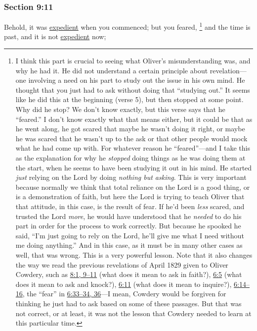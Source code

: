 	\subsubsection{Section 9:11} %
		\label{DC9-11}

		Behold, it was \hyperref[EXPEDIENT]{expedient} when you commenced; but you feared,%
			\footnote{%
				I think this part is crucial to seeing what Oliver's misunderstanding was, and why he had it. He did not understand a certain principle about revelation---one involving a need on his part to study out the issue in his own mind. He thought that you just had to ask without doing that ``studying out.'' It seems like he did this at the beginning (verse 5), but then stopped at some point. Why did he stop? We don't know exactly, but this verse says that he ``feared.'' I don't know exactly what that means either, but it could be that as he went along, he got scared that maybe he wasn't doing it right, or maybe he was scared that he wasn't up to the ask or that other people would mock what he had come up with. For whatever reason he ``feared''---and I take this as the explanation for why he \textit{stopped} doing things as he was doing them at the start, when he seems to have been studying it out in his mind. He started \textit{just} relying on the Lord by doing \textit{nothing but asking}. This is very important because normally we think that total reliance on the Lord is a good thing, or is a demonstration of faith, but here the Lord is trying to teach Oliver that that attitude, in this case, is the result of fear. If he'd been \textit{less} scared, and trusted the Lord \textit{more}, he would have understood that he \textit{needed} to do his part in order for the process to work correctly. But because he spooked he said, ``I'm just going to rely on the Lord, he'll give me what I need without me doing anything.'' And in this case, as it must be in many other cases as well, that was wrong. This is a very powerful lesson. Note that it also changes the way we read the previous revelations of April 1829 given to Oliver Cowdery, such as \hyperref[DC8-1]{8:1, 9--11} (what does it mean to ask in faith?), \hyperref[DC6-5]{6:5} (what does it mean to ask and knock?), \hyperref[DC6-11]{6:11} (what does it mean to inquire?), \hyperref[DC6-14]{6:14--16}, the ``fear'' in \hyperref[DC6-33]{6:33--34, 36}---I mean, Cowdery would be forgiven for thinking he just had to ask based on some of these passages. But that was not correct, or at least, it was not the lesson that Cowdery needed to learn at this particular time.
				}
		and the time is past, and it is not \hyperref[EXPEDIENT]{expedient} now;

